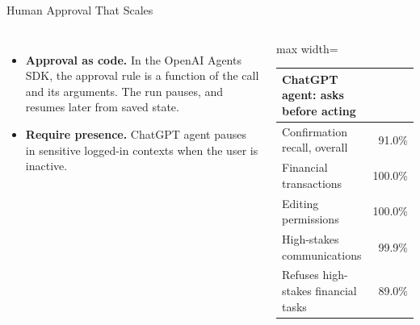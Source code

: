 \begin{frame}{Human Approval That Scales}
    \begin{columns}[T,onlytextwidth]
        \begin{itemize}\itemsep0.45em
            \item \textbf{Approval as code.} In the OpenAI Agents SDK, the approval rule is a function of the call and its arguments. The run pauses, and resumes later from saved state.
            \item \textbf{Require presence.} ChatGPT agent pauses in sensitive logged-in contexts when the user is inactive.
        \end{itemize}
        \centering
        \small
        \renewcommand{\arraystretch}{1.2}
        \begin{adjustbox}{max width=\linewidth}\begin{tabular}{>{\raggedright\arraybackslash}p{3.9cm}r}
            \toprule
            \textbf{ChatGPT agent: asks before acting} & \\
            \midrule
            Confirmation recall, overall & 91.0\% \\
            Financial transactions & 100.0\% \\
            Editing permissions & 100.0\% \\
            High-stakes communications & 99.9\% \\
            \midrule
            Refuses high-stakes financial tasks & \alert{89.0\%} \\
            \bottomrule
        \end{tabular}\end{adjustbox}
    \end{columns}
    \vspace{0.4em}
\end{frame}

